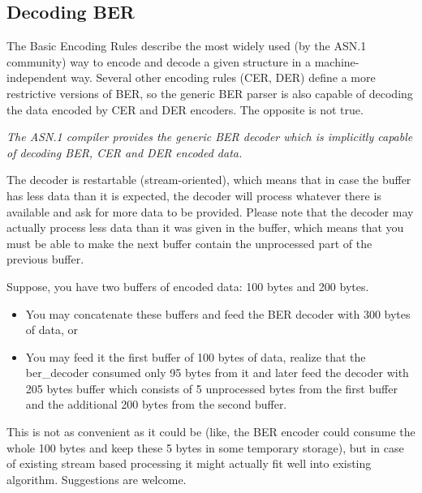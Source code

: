 \documentclass[english,oneside,12pt]{book}
\begin{document}
\subsection{\label{sub:Decoding-BER}Decoding BER}

The Basic Encoding Rules describe the most widely used (by the ASN.1
community) way to encode and decode a given structure in a machine-independent
way. Several other encoding rules (CER, DER) define a more restrictive
versions of BER, so the generic BER parser is also capable of decoding
the data encoded by CER and DER encoders. The opposite is not true.

\emph{The ASN.1 compiler provides the generic BER decoder which is
implicitly capable of decoding BER, CER and DER encoded data.}

The decoder is restartable (stream-oriented), which means that in
case the buffer has less data than it is expected, the decoder will
process whatever there is available and ask for more data to be provided.
Please note that the decoder may actually process less data than it
was given in the buffer, which means that you must be able to make
the next buffer contain the unprocessed part of the previous buffer.

Suppose, you have two buffers of encoded data: 100 bytes and 200 bytes.
\begin{itemize}
\item You may concatenate these buffers and feed the BER decoder with 300
bytes of data, or
\item You may feed it the first buffer of 100 bytes of data, realize that
the ber\_decoder consumed only 95 bytes from it and later feed the
decoder with 205 bytes buffer which consists of 5 unprocessed bytes
from the first buffer and the additional 200 bytes from the second
buffer.
\end{itemize}
This is not as convenient as it could be (like, the BER encoder could
consume the whole 100 bytes and keep these 5 bytes in some temporary
storage), but in case of existing stream based processing it might
actually fit well into existing algorithm. Suggestions are welcome.
\end{document}
